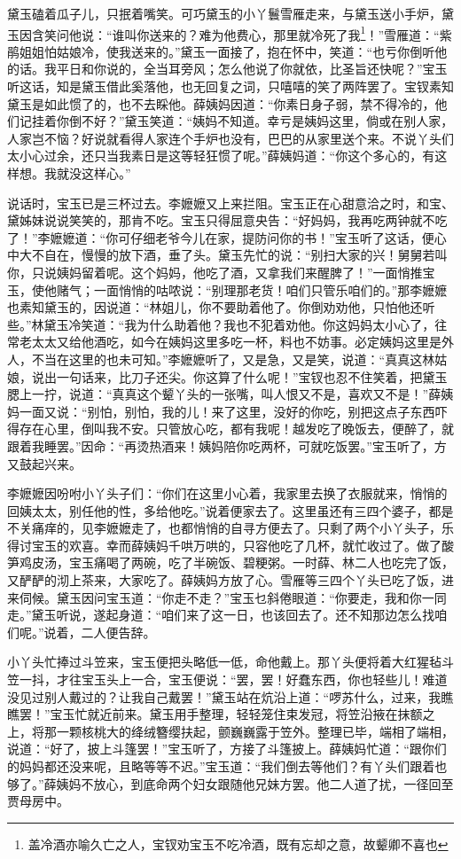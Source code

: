 \documentclass[12pt,oneside]{book}
\begin{document}
黛玉磕着瓜子儿，只抿着嘴笑。可巧黛玉的小丫鬟雪雁走来，与黛玉送小手炉，黛玉因含笑问他说：“谁叫你送来的？难为他费心，那里就冷死了我\footnote{盖冷酒亦喻久亡之人，宝钗劝宝玉不吃冷酒，既有忘却之意，故颦卿不喜也}！”雪雁道：“紫鹃姐姐怕姑娘冷，使我送来的。”黛玉一面接了，抱在怀中，笑道：“也亏你倒听他的话。我平日和你说的，全当耳旁风；怎么他说了你就依，比圣旨还快呢？”宝玉听这话，知是黛玉借此奚落他，也无回复之词，只嘻嘻的笑了两阵罢了。宝钗素知黛玉是如此惯了的，也不去睬他。薛姨妈因道：“你素日身子弱，禁不得冷的，他们记挂着你倒不好？”黛玉笑道：“姨妈不知道。幸亏是姨妈这里，倘或在别人家，人家岂不恼？好说就看得人家连个手炉也没有，巴巴的从家里送个来。不说丫头们太小心过余，还只当我素日是这等轻狂惯了呢。”薛姨妈道：“你这个多心的，有这样想。我就没这样心。”

说话时，宝玉已是三杯过去。李嬷嬷又上来拦阻。宝玉正在心甜意洽之时，和宝、黛姊妹说说笑笑的，那肯不吃。宝玉只得屈意央告：“好妈妈，我再吃两钟就不吃了！”李嬷嬷道：“你可仔细老爷今儿在家，提防问你的书！”宝玉听了这话，便心中大不自在，慢慢的放下酒，垂了头。黛玉先忙的说：“别扫大家的兴！舅舅若叫你，只说姨妈留着呢。这个妈妈，他吃了酒，又拿我们来醒脾了！”一面悄推宝玉，使他赌气；一面悄悄的咕哝说：“别理那老货！咱们只管乐咱们的。”那李嬷嬷也素知黛玉的，因说道：“林姐儿，你不要助着他了。你倒劝劝他，只怕他还听些。”林黛玉冷笑道：“我为什么助着他？我也不犯着劝他。你这妈妈太小心了，往常老太太又给他酒吃，如今在姨妈这里多吃一杯，料也不妨事。必定姨妈这里是外人，不当在这里的也未可知。”李嬷嬷听了，又是急，又是笑，说道：“真真这林姑娘，说出一句话来，比刀子还尖。你这算了什么呢！”宝钗也忍不住笑着，把黛玉腮上一拧，说道：“真真这个颦丫头的一张嘴，叫人恨又不是，喜欢又不是！”薛姨妈一面又说：“别怕，别怕，我的儿！来了这里，没好的你吃，别把这点子东西吓得存在心里，倒叫我不安。只管放心吃，都有我呢！越发吃了晚饭去，便醉了，就跟着我睡罢。”因命：“再烫热酒来！姨妈陪你吃两杯，可就吃饭罢。”宝玉听了，方又鼓起兴来。

李嬷嬷因吩咐小丫头子们：“你们在这里小心着，我家里去换了衣服就来，悄悄的回姨太太，别任他的性，多给他吃。”说着便家去了。这里虽还有三四个婆子，都是不关痛痒的，见李嬷嬷走了，也都悄悄的自寻方便去了。只剩了两个小丫头子，乐得讨宝玉的欢喜。幸而薛姨妈千哄万哄的，只容他吃了几杯，就忙收过了。做了酸笋鸡皮汤，宝玉痛喝了两碗，吃了半碗饭、碧粳粥。一时薛、林二人也吃完了饭，又酽酽的沏上茶来，大家吃了。薛姨妈方放了心。雪雁等三四个丫头已吃了饭，进来伺候。黛玉因问宝玉道：“你走不走？”宝玉乜斜倦眼道：“你要走，我和你一同走。”黛玉听说，遂起身道：“咱们来了这一日，也该回去了。还不知那边怎么找咱们呢。”说着，二人便告辞。

小丫头忙捧过斗笠来，宝玉便把头略低一低，命他戴上。那丫头便将着大红猩毡斗笠一抖，才往宝玉头上一合，宝玉便说：“罢，罢！好蠢东西，你也轻些儿！难道没见过别人戴过的？让我自己戴罢！”黛玉站在炕沿上道：“啰苏什么，过来，我瞧瞧罢！”宝玉忙就近前来。黛玉用手整理，轻轻笼住束发冠，将笠沿掖在抹额之上，将那一颗核桃大的绛绒簪缨扶起，颤巍巍露于笠外。整理已毕，端相了端相，说道：“好了，披上斗篷罢！”宝玉听了，方接了斗篷披上。薛姨妈忙道：“跟你们的妈妈都还没来呢，且略等等不迟。”宝玉道：“我们倒去等他们？有丫头们跟着也够了。”薛姨妈不放心，到底命两个妇女跟随他兄妹方罢。他二人道了扰，一径回至贾母房中。
\end{document}

